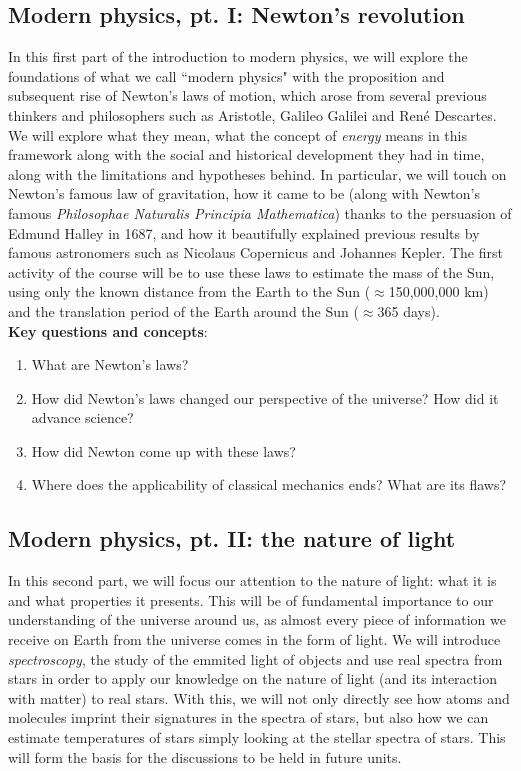 \documentclass{tufte-handout}
\begin{document}
\begin{fullwidth}
\subsection{Modern physics, pt. I: Newton's revolution}
In this first part of the introduction to modern physics, we will explore the foundations of what we call ``modern physics" with the proposition 
and subsequent rise of Newton's laws of motion, which arose from several previous thinkers and philosophers such as Aristotle, Galileo Galilei 
and Ren\'e Descartes. We will explore what they mean, what the concept of \textit{energy} means in this framework along with the social and 
historical development they had in time, along with the limitations and hypotheses behind. In particular, we will touch on Newton's famous 
law of gravitation, how it came to be (along with Newton's famous \textit{Philosophae Naturalis Principia Mathematica}) thanks to the persuasion 
of Edmund Halley in 1687, and how it beautifully explained previous results by famous astronomers such as Nicolaus Copernicus and Johannes Kepler. 
The first activity of the course will be to use these laws to estimate the mass of the Sun, using only the known distance from the Earth to the Sun 
($\approx$150,000,000 km) and the translation period of the Earth around the Sun ($\approx$365 days).\\
\vspace{0.5 cm}
\noindent \textbf{Key questions and concepts}:
\begin{enumerate}
\item What are Newton's laws?
\item How did Newton's laws changed our perspective of the universe? How did it advance science?
\item How did Newton come up with these laws? 
\item Where does the applicability of classical mechanics ends? What are its flaws?
\end{enumerate}

\subsection{Modern physics, pt. II: the nature of light}
In this second part, we will focus our attention to the nature of light: what it is and what properties it presents. This will be of fundamental 
importance to our understanding of the universe around us, as almost every piece of information we receive on Earth from the universe comes in 
the form of light. We will introduce \textit{spectroscopy}, the study of the emmited light of objects and use real spectra from stars in order to 
apply our knowledge on the nature of light (and its interaction with matter) to real stars. With this, we will not only directly see how atoms and 
molecules imprint their signatures in the spectra of stars, but also how we can estimate temperatures of stars simply looking at the stellar spectra 
of stars. This will form the basis for the discussions to be held in future units. 


\end{fullwidth}
\end{document}
